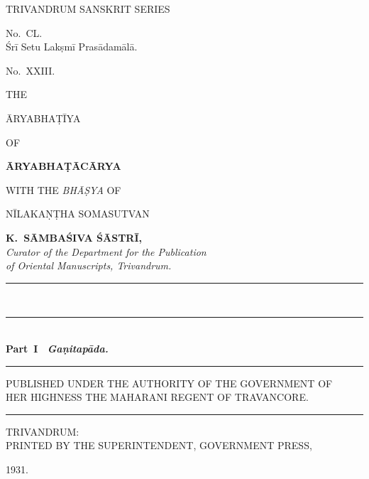 \documentclass[11pt, openany]{book}
\begin{document}
\addtolength{\oddsidemargin}{0.1in}
	\addtolength{\evensidemargin}{0.1in}
	\addtolength{\textwidth}{1.75in}

	\addtolength{\topmargin}{-.875in}
	\addtolength{\textheight}{1.75in}
	
\thispagestyle{empty}
\begin{center}
	\large{\en TRIVANDRUM SANSKRIT SERIES}
	\vspace{0.3cm}
	
	{\en No.~CL.}\\
	\vspace{0.3cm} {\en Śrī Setu Lakṣmī Prasādamālā.}
	\vspace{0.3cm}
	
	{\en No.~XXIII.}
	
	\vspace{1.5cm} 
	{\en THE}
	
	\vspace{0.3cm}
	{\LARGE{\en ĀRYABHAṬĪYA}}
	
	\vspace{0.3cm} 
	
	{\en OF} 
	
	\vspace{0.3cm}
	\textbf{\en ĀRYABHAṬĀCĀRYA}
	
	\vspace{0.3cm} 
	
	{\footnotesize{\en WITH THE \emph{BHĀṢYA} OF}
		
		\vspace{0.2cm} \en NĪLAKAṆṬHA SOMASUTVAN}
	
	
	\vspace{0.3cm}
	\textbf{\en K.~SĀMBAŚIVA ŚĀSTRĪ,}\\
	\vspace{0.2cm}
	\emph{\en Curator of the Department for the Publication \\
			of Oriental Manuscripts, Trivandrum.}\\
	\rule{2cm}{0.3mm}\\
	\vspace{0.4cm}
	\rule{6cm}{0.3mm}\\
	{\textbf{\en Part~I \textendash\ \emph{\en Gaṇitapāda.}}}\\
	\rule{6cm}{0.4mm}
	\vspace{0.5cm}
	
	\small{\en PUBLISHED UNDER THE AUTHORITY OF THE GOVERNMENT OF\\
		HER HIGHNESS THE MAHARANI REGENT OF TRAVANCORE.}\\
	\rule{2cm}{0.3mm}
	\vspace{0.3cm}
	
	\small{\en TRIVANDRUM:\\
		PRINTED BY THE SUPERINTENDENT, GOVERNMENT PRESS,}
	
	1931.
\end{center}
\end{document}
